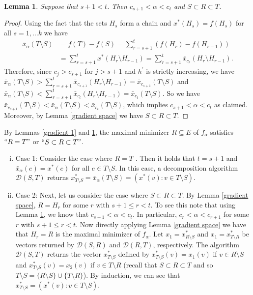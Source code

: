 \documentclass{article}
\newtheorem{lemma}{Lemma}
\begin{document}
\begin{lemma}\label{gradient 2}
Suppose that $s + 1 < t$. Then $ c_{s+1} < \alpha < c_t$ and $S \subset R \subset T$.
\end{lemma}
\begin{proof}
Using the fact that the sets $H_s$ form a chain and $x^*(H_s) = f(H_s)$ for all $s = 1,\dots k$ we have
\begin{align*}
    \bar{x}_{\alpha}(T\setminus S) &= f(T) - f(S) = \sum_{r = s+1}^t (f(H_r) - f(H_{r-1}))  \\
    &= \sum_{r = s+1}^t x^*(H_r\setminus H_{r-1}) = \sum_{r = s+1}^t \bar{x}_{c_r}(H_r\setminus H_{r-1}).
\end{align*}
Therefore, since $c_j > c_{s+1}$ for $j > s+1$ and $h^\prime$ is strictly increasing, we have $\bar{x}_{\alpha}(T\setminus S) > \sum_{r = s+1}^t \bar{x}_{c_{s+1}}(H_r\setminus H_{r-1}) = \bar{x}_{c_{s+1}}(T\setminus S)$ and $\bar{x}_{\alpha}(T\setminus S) < \sum_{r = s+1}^t \bar{x}_{c_{t}}(H_r\setminus H_{r-1}) = \bar{x}_{c_{t}}(T\setminus S)$. So we have $\bar{x}_{c_{s+1}}(T\setminus S)< \bar{x}_{\alpha}(T\setminus S) <\bar{x}_{c_{t}}(T\setminus S)$, which implies $ c_{s+1} < \alpha < c_t$ as claimed. Moreover, by Lemma \ref{gradient space} we have $S \subset R \subset T$.
\end{proof}

By Lemmas \ref{gradient 1} and \ref{gradient 2}, the maximal minimizer $R \subseteq E$ of $f_\alpha$ satisfies $``R = T"$ or
$``S \subset R \subset T"$. 
\begin{enumerate}[(i)]
    \item Case 1: Consider the case where $R = T$ . Then it holds that $t = s + 1$ and $\bar{x}_\alpha(e) = x^*(e)$ for all $e \in T\setminus S$. In this case, a decomposition algorithm $\mathcal{D}(S, T)$ returns $x^*_{T\setminus S} = \bar{x}_\alpha(T\setminus S) = (x^*(v): v \in T \setminus S)$.
    \item Case 2: Next, let us consider the case where $S \subset R \subset T$. By Lemma \eqref{gradient space}, $R = H_r$ for some $r$ with $s + 1 \leq r < t$. {To see this note that using Lemma \ref{gradient 2}, we know that $ c_{s+1} < \alpha < c_t$. In particular, $c_{r} < \alpha < c_{r+1}$ for some $r$ with $s + 1 \leq r < t$. Now directly applying Lemma \ref{gradient space} we have that $H_r = R$ is the maximal minimizer of $f_\alpha$.} Let $x_1 = x^*_{R\setminus S}$ and $x_1 = x^*_{T\setminus R}$ be vectors returned by $\mathcal{D}(S, R)$ and $\mathcal{D}(R, T)$, respectively. The algorithm $\mathcal{D}(S, T)$ returns the vector $x^*_{T\setminus S}$ defined by $x^*_{T\setminus S}(v) = x_1(v)$ if $v \in R\setminus S$ and $x^*_{T\setminus S}(v) = x_2(v)$ if $v \in T\setminus R$ (recall that $S \subset R \subset T$ and so $T \setminus S = \{R \setminus S\} \cup \{T \setminus R\}$). By induction, we can see that $x^*_{T\setminus S} = (x^*(v): v \in T \setminus S)$.
\end{enumerate}
\end{document}
